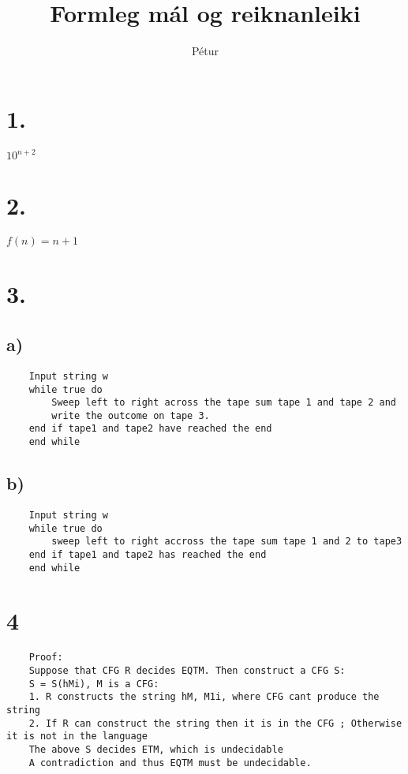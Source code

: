 \documentclass[]{article}
\begin{document}
\title{Formleg mál og reiknanleiki}
\author{Pétur}
\maketitle

\section*{1.}
$10^{n+2}$

\section*{2.}
$f(n) = n + 1$

\section*{3.}

\subsection*{a)}

\begin{lstlisting}
	Input string w
	while true do
		Sweep left to right across the tape sum tape 1 and tape 2 and 
		write the outcome on tape 3.
	end if tape1 and tape2 have reached the end
	end while
\end{lstlisting}

\subsection*{b)}

\begin{lstlisting}
	Input string w
	while true do
		sweep left to right accross the tape sum tape 1 and 2 to tape3
	end if tape1 and tape2 has reached the end
	end while
\end{lstlisting}

\section*{4}

\begin{lstlisting}
	Proof:
	Suppose that CFG R decides EQTM. Then construct a CFG S:
	S = S(hMi), M is a CFG:
	1. R constructs the string hM, M1i, where CFG cant produce the string
	2. If R can construct the string then it is in the CFG ; Otherwise it is not in the language
	The above S decides ETM, which is undecidable 
	A contradiction and thus EQTM must be undecidable.
\end{lstlisting}
\end{document}
